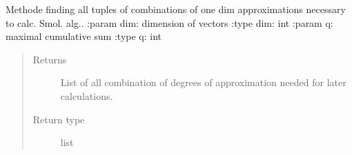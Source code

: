 \documentclass[letterpaper,10pt,english]{sphinxmanual}
\begin{document}
\begin{fulllineitems}
\label{\detokenize{index:Studienprojekt_Smolyak_qmc_one_point.find_all_sensible_combinations}}
Methode finding all tuples of combinations of one dim approximations necessary to calc. Smol. alg..
:param dim: dimension of vectors
:type dim: int
:param q: maximal cumulative sum
:type q: int
\begin{quote}\begin{description}
\item[{Returns}] \leavevmode
List of all combination of degrees of approximation needed for later calculations.

\item[{Return type}] \leavevmode
list

\end{description}\end{quote}

\end{fulllineitems}

\end{document}
